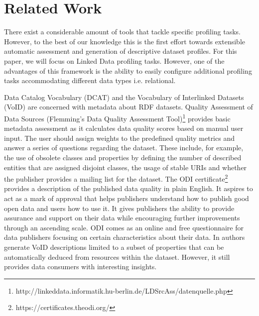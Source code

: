 \documentclass[runningheads,a4paper]{llncs}
\begin{document}

\section{Related Work}
\label{sec:Related Work}

There exist a considerable amount of tools that tackle specific profiling tasks. However, to the best of our knowledge this is the first effort towards extensible automatic assessment and generation of descriptive dataset profiles. For this paper, we will focus on Linked Data profiling tasks. However, one of the advantages of this framework is the ability to easily configure additional profiling tasks accommodating different data types i.e. relational.

Data Catalog Vocabulary (DCAT)\cite{Erickson:14:DCV} and the Vocabulary of Interlinked Datasets (VoID)\cite{Cyganiak:11:DLD} are concerned with metadata about RDF datasets. Quality Assessment of Data Sources (Flemming's Data Quality Assessment Tool)\footnote{http://linkeddata.informatik.hu-berlin.de/LDSrcAss/datenquelle.php} provides basic metadata assessment as it calculates data quality scores based on manual user input. The user should assign weights to the predefined quality metrics and answer a series of questions regarding the dataset. These include, for example, the use of obsolete classes and properties by defining the number of described entities that are assigned disjoint classes, the usage of stable URIs and whether the publisher provides a mailing list for the dataset. The ODI certificate\footnote {https://certificates.theodi.org/} provides a description of the published data quality in plain English. It aspires to act as a mark of approval that helps publishers understand how to publish good open data and users how to use it. It gives publishers the ability to provide assurance and support on their data while encouraging further improvements through an ascending scale. ODI comes as an online and free questionnaire for data publishers focusing on certain characteristics about their data. In \cite{BoHm:2011:CVD:2030805.2031001} authors generate VoID descriptions limited to a subset of properties that can be automatically deduced from resources within the dataset. However, it still provides data consumers with interesting insights.
\end{document}
